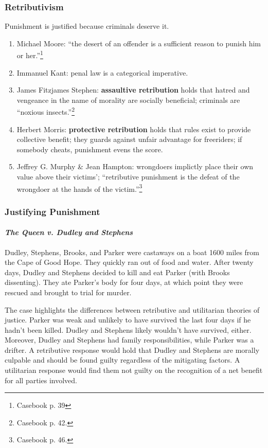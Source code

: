 \subsubsection{Retributivism}

Punishment is justified because criminals deserve it.

\begin{enumerate}
    \item Michael Moore: ``the desert of an offender is a sufficient reason to punish him or her.''\footnote{Casebook p. 39}
    \item Immanuel Kant: penal law is a categorical imperative.
    \item James Fitzjames Stephen: \textbf{assaultive retribution} holds that hatred and vengeance in the name of morality are socially beneficial; criminals are ``noxious insects.''\footnote{Casebook p. 42.}
    \item Herbert Morris: \textbf{protective retribution} holds that rules exist to provide collective benefit; they guards against unfair advantage for freeriders; if somebody cheats, punishment evens the score.
    \item Jeffrey G. Murphy \& Jean Hampton: wrongdoers implictly place their own value above their victims'; ``retributive punishment is the defeat of the wrongdoer at the hands of the victim.''\footnote{Casebook p. 46.}
\end{enumerate}

\subsubsection{Justifying Punishment}

\paragraph{\emph{The Queen v. Dudley and Stephens}}

Dudley, Stephens, Brooks, and Parker were castaways on a boat 1600 miles from the Cape of Good Hope. They quickly ran out of food and water. After twenty days, Dudley and Stephens decided to kill and eat Parker (with Brooks dissenting). They ate Parker’s body for four days, at which point they were rescued and brought to trial for murder.

The case highlights the differences between retributive and utilitarian theories of justice. Parker was weak and unlikely to have survived the last four days if he hadn’t been killed. Dudley and Stephens likely wouldn’t have survived, either. Moreover, Dudley and Stephens had family responsibilities, while Parker was a drifter. A retributive response would hold that Dudley and Stephens are morally culpable and should be found guilty regardless of the mitigating factors. A utilitarian response would find them not guilty on the recognition of a net benefit for all parties involved.

